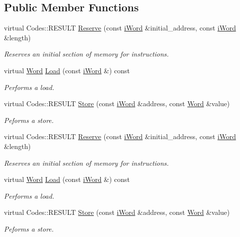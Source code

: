 \subsection*{Public Member Functions}
\begin{DoxyCompactItemize}
\item 
virtual Codes::RESULT \hyperlink{classMemory_a80cd994d4833dde66b8005184e510dda}{Reserve} (const \hyperlink{classiWord}{iWord} \&initial\_\-address, const \hyperlink{classiWord}{iWord} \&length)
\begin{DoxyCompactList}\small\item\em Reserves an initial section of memory for instructions. \item\end{DoxyCompactList}\item 
virtual \hyperlink{classWord}{Word} \hyperlink{classMemory_aca021609915080b38ca1b00d9b416e80}{Load} (const \hyperlink{classiWord}{iWord} \&) const 
\begin{DoxyCompactList}\small\item\em Performs a load. \item\end{DoxyCompactList}\item 
virtual Codes::RESULT \hyperlink{classMemory_a23703464fb24710d09be1b2010e79edc}{Store} (const \hyperlink{classiWord}{iWord} \&address, const \hyperlink{classWord}{Word} \&value)
\begin{DoxyCompactList}\small\item\em Peforms a store. \item\end{DoxyCompactList}\item 
virtual Codes::RESULT \hyperlink{classMemory_afe683401c1656b0a077d5f666f9c8d51}{Reserve} (const \hyperlink{classiWord}{iWord} \&initial\_\-address, const \hyperlink{classiWord}{iWord} \&length)
\begin{DoxyCompactList}\small\item\em Reserves an initial section of memory for instructions. \item\end{DoxyCompactList}\item 
virtual \hyperlink{classWord}{Word} \hyperlink{classMemory_af043b481b061644f9ff6cd7288655c93}{Load} (const \hyperlink{classiWord}{iWord} \&) const 
\begin{DoxyCompactList}\small\item\em Performs a load. \item\end{DoxyCompactList}\item 
virtual Codes::RESULT \hyperlink{classMemory_a100745221ade9b322743514d91fcce23}{Store} (const \hyperlink{classiWord}{iWord} \&address, const \hyperlink{classWord}{Word} \&value)
\begin{DoxyCompactList}\small\item\em Peforms a store. \item\end{DoxyCompactList}\end{DoxyCompactItemize}
